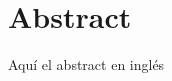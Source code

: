 \cleardoublepage
\thispagestyle{empty}
\chapter*{Abstract}
\begin{fullwidth}
	Aquí el abstract en inglés
\end{fullwidth}